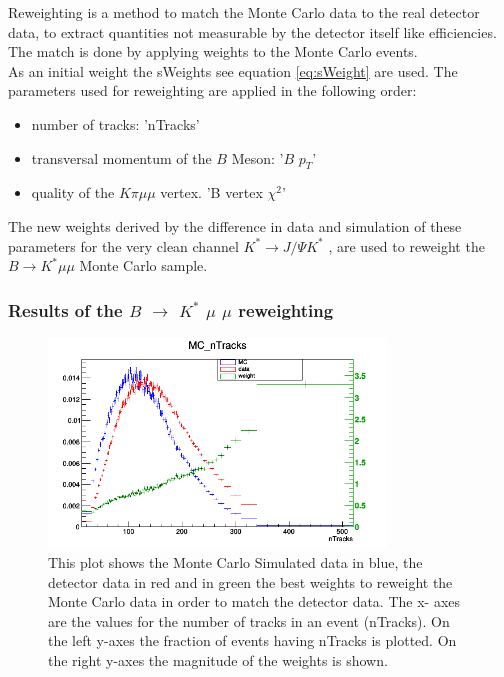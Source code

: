 \documentclass[english]{uzhpub}
\begin{document}
Reweighting is a method to match the Monte Carlo data to the real detector data, to extract quantities not measurable by the detector itself like efficiencies. The match is done by applying weights to the Monte Carlo events. \\
As an initial weight the sWeights see equation \ref{eq:sWeight} are used. The parameters used for reweighting are applied in the following order:
\begin{itemize}
  \item number of tracks: 'nTracks'
  \item transversal momentum of the $B$ Meson: '$B$ $p_T$'
  \item quality of the $K \pi \mu \mu$ vertex. 'B vertex $\chi^2$'
\end{itemize}
The new weights derived by the difference in data and simulation of these parameters for the very clean channel $K^* \rightarrow J/ \Psi K^{*}$ \cite{bib:JPsi}, are used to reweight the $B \rightarrow K^* \mu \mu$ Monte Carlo sample.

\subsubsection{Results of the $B$ $\rightarrow$ $K^{*}$ $\mu$ $\mu$ reweighting}

\begin{figure}[H]
\centering
\includegraphics[width=0.8\textwidth]{Reweighting/nTracksw}
\caption{This plot shows the Monte Carlo Simulated data in blue, the detector data in red and in green the best weights to reweight the Monte Carlo data in order to match the detector data. The x- axes are the values for the number of tracks in an event (nTracks). On the left y-axes the fraction of events having nTracks is plotted. On the right y-axes the magnitude of the weights is shown.}
\label{fig:nTracksw}
\end{figure}
\end{document}
